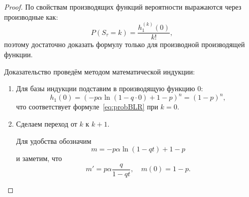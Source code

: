 \documentclass[12pt, specialist, subf, substylefile = spbu.rtx]{disser}
\begin{document}
	\begin{proof}
		По свойствам производящих функций вероятности выражаются через производные как:
		\[
			P(S _\tau = k) = \frac{h _1 ^{(k)}(0)} {k!},
		\]
		поэтому достаточно доказать формулу только для производной производящей функции.
		
		Доказательство проведём методом математической индукции:
		
		\begin{enumerate}
			\item Для базы индукции подставим в производящую функцию $0$:
			\[
				h _1(0) = \left(-p \alpha \ln (1 - q \cdot 0) + 1 - p\right) ^n = (1 - p) ^n,
			\]
			что соответствует формуле~\eqref{eq:probBLR} при $k = 0$.
			
			\item Сделаем переход от $k$ к $k + 1$.
			
			Для удобства обозначим
			\[
				m = -p\alpha \ln(1 - qt) + 1 - p
			\]
			и заметим, что
			\[
				m ' = p \alpha \frac{q}{1 - q t}, \quad m(0) = 1 - p.
			\]
			

\end{enumerate}
\end{proof}
\end{document}

